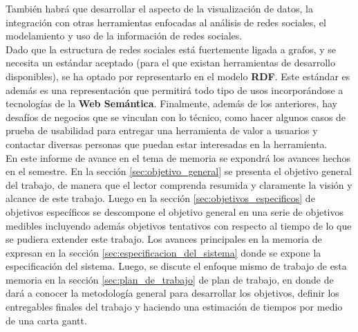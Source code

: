 \begin{intro}
  También habrá que desarrollar el aspecto de la visualización de datos, la integración con otras herramientas enfocadas al análisis de redes sociales, el modelamiento y uso de la información de redes sociales.\\

  Dado que la estructura de redes sociales está fuertemente ligada a grafos, y se necesita un estándar aceptado (para el que existan herramientas de desarrollo disponibles), se ha optado por representarlo en el modelo \textbf{RDF}. Este estándar es además es una representación que permitirá todo tipo de usos incorporándose a tecnologías de la \textbf{Web Semántica}. Finalmente, además de los anteriores, hay desafíos de negocios que se vinculan con lo técnico, como hacer algunos casos de prueba de usabilidad para entregar una herramienta de valor a usuarios y contactar diversas personas que puedan estar interesadas en la herramienta.\\

  En este informe de avance en el tema de memoria se expondrá los avances hechos en el semestre. En la sección \ref{sec:objetivo_general} se presenta el objetivo general del trabajo, de manera que el lector comprenda resumida y claramente la visión y alcance de este trabajo. Luego en la sección \ref{sec:objetivos_especificos} de objetivos específicos se descompone el objetivo general en una serie de objetivos medibles incluyendo además objetivos tentativos con respecto al tiempo de lo que se pudiera extender este trabajo. Los avances principales en la memoria de expresan en la sección \ref{sec:especificacion_del_sistema} donde se expone la especificación del sistema. Luego, se discute el enfoque mismo de trabajo de esta memoria en la sección \ref{sec:plan_de_trabajo} de plan de trabajo, en donde de dará a conocer la metodología general para desarrollar los objetivos, definir los entregables finales del trabajo y haciendo una estimación de tiempos por medio de una carta gantt.
  
\end{intro}